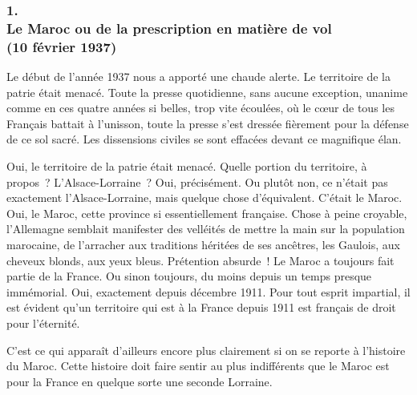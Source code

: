 \documentclass[french,twoside]{book} %
\begin{document}
\subsubsection[1. Le Maroc ou de la prescription en matière de vol, (10 février 1937)]{1. \\
Le Maroc ou de la prescription en matière de vol \\
(10 février 1937)}
\noindent \par
Le début de l'année 1937 nous a apporté une chaude alerte. Le territoire de la patrie était menacé. Toute la presse quotidienne, sans aucune exception, unanime comme en ces quatre années si belles, trop vite écoulées, où le cœur de tous les Français battait à l'unisson, toute la presse s'est dressée fièrement pour la défense de ce sol sacré. Les dissensions civiles se sont effacées devant ce magnifique élan.\par
Oui, le territoire de la patrie était menacé. Quelle portion du territoire, à propos ? L'Alsace-Lorraine ? Oui, précisément. Ou plutôt non, ce n'était pas exactement l'Alsace-Lorraine, mais quelque chose d'équivalent. C'était le Maroc. Oui, le Maroc, cette province si essentiellement française. Chose à peine croyable, l'Allemagne semblait manifester des velléités de mettre la main sur la population marocaine, de l'arracher aux traditions héritées de ses ancêtres, les Gaulois, aux cheveux blonds, aux yeux bleus. Prétention absurde ! Le Maroc a toujours fait partie de la France. Ou sinon toujours, du moins depuis un temps presque immémorial. Oui, exactement depuis décembre 1911. Pour tout esprit impartial, il est évident qu'un territoire qui est à la France depuis 1911 est français de droit pour l'éternité.\par
C'est ce qui apparaît d'ailleurs encore plus clairement si on se reporte à l'histoire du Maroc. Cette histoire doit faire sentir au plus indifférents que le Maroc est pour la France en quelque sorte une seconde Lorraine.\par
\end{document}
